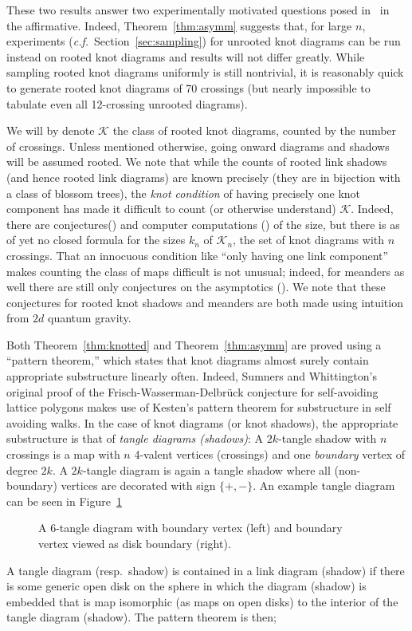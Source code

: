 \documentclass[submission%
]{dmtcs}
\newcommand{\KnotDiaClass}{\mathscr{K}}
\newcommand{\KnotDiaCard}{k}
\begin{document}
These two results answer two experimentally motivated questions posed
in~\cite{CCMknotdiagrams2015} in the affirmative. Indeed,
Theorem~\ref{thm:asymm} suggests that, for large $n$, experiments
(\textit{c.f.}\ Section~\ref{sec:sampling}) for unrooted knot diagrams
can be run instead on rooted knot diagrams and results will not differ
greatly. While sampling rooted knot diagrams uniformly is still
nontrivial, it is reasonably quick to generate rooted knot diagrams of
70 crossings (but nearly impossible to tabulate even all 12-crossing
unrooted diagrams).

We will by denote $\KnotDiaClass$ the class of rooted knot diagrams,
counted by the number of crossings. Unless mentioned otherwise, going
onward diagrams and shadows will be assumed rooted. We note that while
the counts of rooted link shadows (and hence rooted link diagrams) are
known precisely (they are in bijection with a class of blossom trees),
the \emph{knot condition} of having precisely one knot component has
made it difficult to count (or otherwise understand)
$\KnotDiaClass$. Indeed, there are
conjectures(\cite{pzjschaeff2004planecurveasymp}) and computer
computations
(\cite{zuber2015mapsimsperms,pzjtransfermtx,pzjmtxintchap}) of the
size, but there is as of yet no closed formula for the sizes
$\KnotDiaCard_n$ of $\KnotDiaClass_n$, the set of knot diagrams with
$n$ crossings. That an innocuous condition like ``only having one link
component'' makes counting the class of maps difficult is not unusual;
indeed, for meanders as well there are still only conjectures on the
asymptotics (\cite{DiFrancesco2000699}). We note that these conjectures
for rooted knot shadows and meanders are both made using intuition
from $2d$ quantum gravity.

Both Theorem~\ref{thm:knotted} and Theorem~\ref{thm:asymm} are proved
using a ``pattern theorem,'' which states that knot diagrams almost
surely contain appropriate substructure linearly often. Indeed,
Sumners and Whittington's original proof of the
Frisch-Wasserman-Delbr\"uck conjecture for self-avoiding lattice
polygons makes use of Kesten's pattern theorem for substructure in
self avoiding walks. In the case of knot diagrams (or knot shadows),
the appropriate substructure is that of \emph{tangle diagrams
  (shadows)}: A $2k$-tangle shadow with $n$ crossings is a map with
$n$ 4-valent vertices (crossings) and one \emph{boundary} vertex of
degree $2k$. A $2k$-tangle diagram is again a tangle shadow where all
(non-boundary) vertices are decorated with sign $\{+,-\}$. An example
tangle diagram can be seen in Figure~\ref{fig:tangleex}
\begin{figure}[hbtp]
  \centering
  \subfigure{}\hfil
  \subfigure{}
  \caption{A 6-tangle diagram with boundary vertex (left) and boundary
    vertex viewed as disk boundary (right).}
  \label{fig:tangleex}
\end{figure}
A tangle
diagram (resp.\ shadow) is contained in a link diagram (shadow) if
there is some generic open disk on the sphere in which the diagram
(shadow) is embedded that is map isomorphic (as maps on open disks) to
the interior of the tangle diagram (shadow). The pattern theorem is
then;
\end{document}

